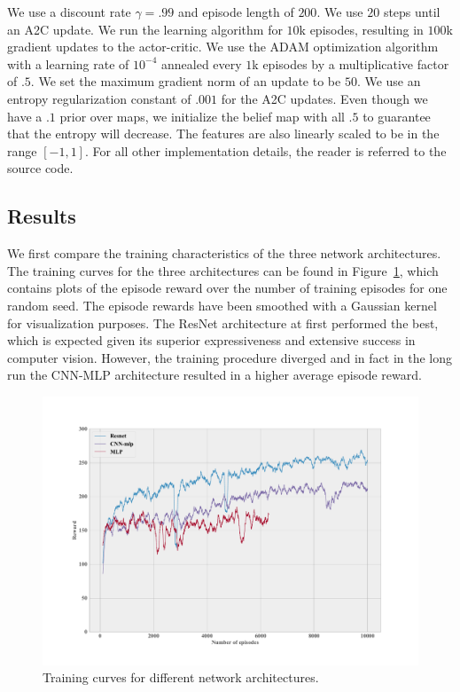 \documentclass{article}
\begin{document}
We use a discount rate $\gamma=.99$ and episode length of $200$. We use $20$ steps until an A2C update. We run the learning algorithm for $10$k episodes, resulting in $100$k gradient updates to the actor-critic. We use the ADAM \cite{kingma2014adam} optimization algorithm with a learning rate of $10^{-4}$ annealed every $1$k episodes by a multiplicative factor of $.5$. We set the maximum gradient norm of an update to be $50$. We use an entropy regularization constant of $.001$ for the A2C updates. Even though we have a $.1$ prior over maps, we initialize the belief map with all $.5$ to guarantee that the entropy will decrease. The features are also linearly scaled to be in the range $[-1, 1]$. For all other implementation details, the reader is referred to the source code.

\subsection{Results}

We first compare the training characteristics of the three network architectures. The training curves for the three architectures can be found in Figure~\ref{fig:learningcurve}, which contains plots of the episode reward over the number of training episodes for one random seed. The episode rewards have been smoothed with a Gaussian kernel for visualization purposes. The ResNet architecture at first performed the best, which is expected given its superior expressiveness and extensive success in computer vision. However, the training procedure diverged and in fact in the long run the CNN-MLP architecture resulted in a higher average episode reward.

\begin{figure}[h]
    \centering
    \label{fig:learningcurve}
    \caption{Training curves for different network architectures.}
    \includegraphics[scale=.3]{figs/learningcurve.pdf}
\end{figure}
\end{document}
